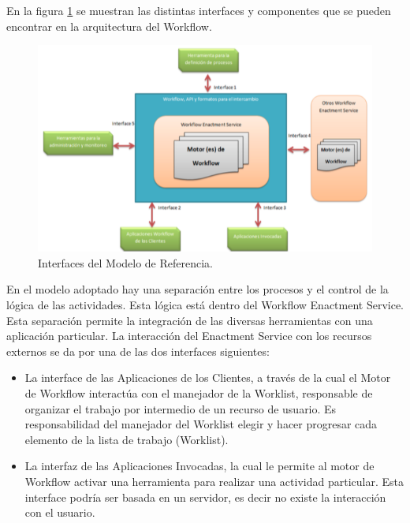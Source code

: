 En la figura \ref{fig:Interfaces del Modelo de Referencia} se muestran las distintas interfaces y componentes que se pueden encontrar en la arquitectura del Workflow.

\begin{figure}[!h] 
	\begin{center}
		\includegraphics [scale=0.50]{imagenes/Interfaces_del_Modelo_de_Referencia.png}
	\end{center}
	\caption{Interfaces del Modelo de Referencia.}
	\label{fig:Interfaces del Modelo de Referencia}
\end{figure} 

En el modelo adoptado hay una separación entre los procesos y el control de la lógica de las actividades. Esta lógica está dentro del Workflow Enactment Service. Esta separación permite la integración de las diversas herramientas con una aplicación particular. La interacción del Enactment Service con los recursos externos se da por una de las dos interfaces siguientes:

\begin{itemize}
	\item La interface de las Aplicaciones de los Clientes, a través de la cual el Motor de Workflow interactúa con el manejador de la Worklist, responsable de organizar el trabajo por intermedio de un recurso de usuario. Es responsabilidad del manejador del Worklist elegir y hacer progresar cada elemento de la lista de trabajo (Worklist).
	
	\item La interfaz de las Aplicaciones Invocadas, la cual le permite al motor de Workflow activar una herramienta para realizar una actividad particular. Esta interface podría ser basada en un servidor, es decir no existe la interacción con el usuario.
	
\end{itemize}

